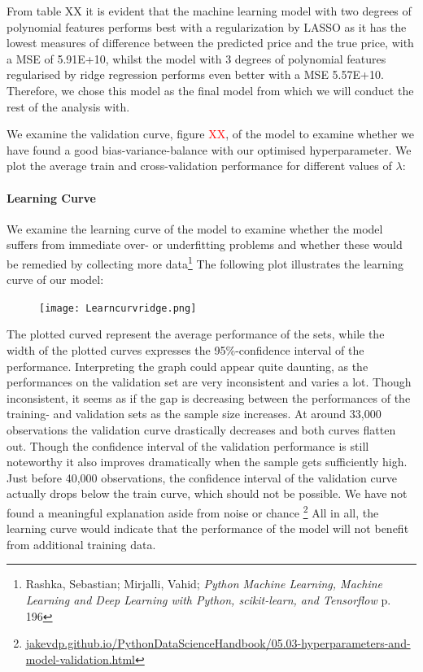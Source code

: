 \documentclass[12pt,a4paper]{article}
\begin{document}
From table XX it is evident that the machine learning model with two degrees of polynomial features performs best with a regularization by LASSO as it has the lowest measures of difference between the predicted price and the true price, with a MSE of 5.91E+10, whilst the model with 3 degrees of polynomial features regularised by ridge regression performs even better with a MSE 5.57E+10. Therefore, we chose this model as the final model from which we will conduct the rest of the analysis with. \newline

We examine the validation curve, figure \textcolor{red}{XX}, of the model to examine whether we have found a good bias-variance-balance with our optimised hyperparameter. We plot the average train and cross-validation performance for different values of $\lambda$: 

\paragraph{Learning Curve}
We examine the learning curve of the model to examine whether the model suffers from immediate over- or underfitting problems and whether these would be remedied by collecting more data\footnote{Rashka, Sebastian; Mirjalli, Vahid; \textit{Python Machine Learning, Machine Learning and Deep Learning with Python, scikit-learn, and Tensorflow} p. 196}
The following plot illustrates the learning curve of our model:
\begin{figure}[H]
\centering
\caption{}
\texttt{[image: Learncurvridge.png]}
\end{figure}
The plotted curved represent the average performance of the sets, while the width of the plotted curves expresses the 95\%-confidence interval of the performance.  
Interpreting the graph could appear quite daunting, as the performances on the validation set are very inconsistent and varies a lot. Though inconsistent, it seems as if the gap is decreasing between the performances of the training- and validation sets as the sample size increases. 
At around 33,000 observations the validation curve drastically decreases and both curves flatten out. Though the confidence interval of the validation performance is still noteworthy it also improves dramatically when the sample gets sufficiently high. Just before 40,000 observations, the confidence interval of the validation curve actually drops below the train curve, which should not be possible. We have not found a meaningful explanation aside from noise or chance \footnote{\href{https://jakevdp.github.io/PythonDataScienceHandbook/05.03-hyperparameters-and-model-validation.html}{jakevdp.github.io/PythonDataScienceHandbook/05.03-hyperparameters-and-model-validation.html}} 
All in all, the learning curve would indicate that the performance of the model will not benefit from additional training data. 
\end{document}
